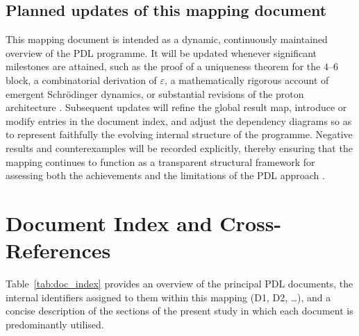 \documentclass{article}
\begin{document}
\subsection{Planned updates of this mapping document}
\label{subsec:roadmap_mapping}

This mapping document is intended as a dynamic, continuously maintained overview of the PDL programme. It will be updated whenever significant milestones are attained, such as the proof of a uniqueness theorem for the $4$--$6$ block, a combinatorial derivation of $\varepsilon$, a mathematically rigorous account of emergent Schr\"odinger dynamics, or substantial revisions of the proton architecture \citep{PDL_position}. Subsequent updates will refine the global result map, introduce or modify entries in the document index, and adjust the dependency diagrams so as to represent faithfully the evolving internal structure of the programme. Negative results and counterexamples will be recorded explicitly, thereby ensuring that the mapping continues to function as a transparent structural framework for assessing both the achievements and the limitations of the PDL approach \citep{PDL_position}.

\newpage

\appendix

\section{Document Index and Cross-References}
\label{app:doc_index}

Table~\ref{tab:doc_index} provides an overview of the principal PDL documents, the internal identifiers assigned to them within this mapping (D1, D2, \dots), and a concise description of the sections of the present study in which each document is predominantly utilised.

\setlength{\LTpre}{18pt}
\setlength{\LTpost}{0pt}
\end{document}
